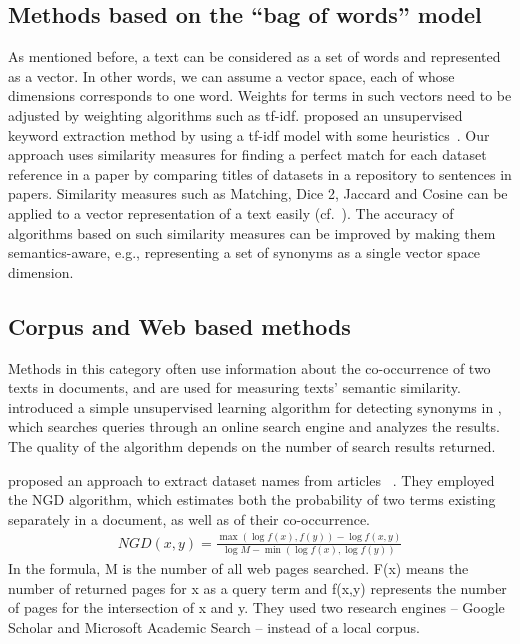 \documentclass{IOS-Book-Article}
\begin{document}
\subsection{Methods based on the “bag of words” model}
As mentioned before, a text can be considered as a set of words and represented as a vector.
In other words, we can assume a vector space, each of whose dimensions corresponds to one word.
Weights for terms in such vectors need to be adjusted by weighting algorithms such as tf-idf.
\citeauthor{Lee2008} proposed an unsupervised keyword extraction method by using a tf-idf model with some heuristics~\citeyearpar{Lee2008}.
Our approach uses similarity measures for finding a perfect match for each dataset reference in a paper by comparing titles of datasets in a repository to sentences in papers.
Similarity measures such as Matching, Dice 2, Jaccard and Cosine can be applied to a vector representation of a text easily (cf.~\citet{ChristopherD1999}).
The accuracy of algorithms based on such similarity measures can be improved by making them semantics-aware, e.g., representing a set of synonyms as a single vector space dimension.

\subsection{Corpus and Web based methods}
Methods in this category often use information about the co-occurrence of two texts in documents, and are used for measuring texts' semantic similarity. \citeauthor{Turney2001} introduced a simple unsupervised learning algorithm for detecting synonyms in \citeyear{Turney2001}, which searches queries through an online search engine and analyzes the results. The quality of the algorithm depends on the number of search results returned.  

\citeauthor{sighal2013} proposed an approach to extract dataset names from articles ~\citeyearpar{sighal2013}. They employed the NGD algorithm, which estimates both the probability of two terms existing separately in a document, as well as of their co-occurrence. 
\begin{align*}
	NGD(x,y)=\frac{\max(\log f(x),f(y))-\log f(x,y)}{\log M -\min(\log f(x),\log f(y))}
\end{align*}
In the formula, M is the number of all web pages searched. F(x) means the number of returned pages for x as a query term and f(x,y) represents the number of pages for the intersection of x and y. They used two research engines -- Google Scholar and Microsoft Academic Search -- instead of a local corpus.
\end{document}
